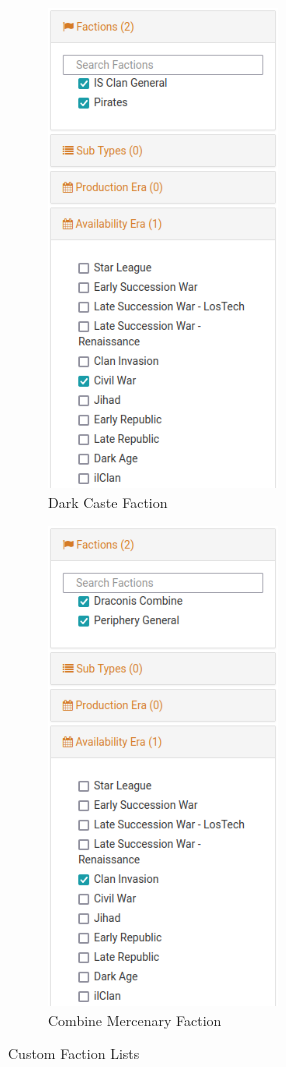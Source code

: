 \begin{figure}[!h]
  \centering
  \begin{subfigure}{0.4\textwidth}
    \centering
    \includegraphics[height=5.0in,width=2.4in]{img/Dark-Caste-List.png}
    \caption*{Dark Caste Faction}
  \end{subfigure}
  \hspace{1in}
  \begin{subfigure}{0.4\textwidth}
    \centering
    \includegraphics[height=5.0in,width=2.4in]{img/Combine-Mercenary-List.png}
    \caption*{Combine Mercenary Faction}
  \end{subfigure}
  \caption*{Custom Faction Lists}
\end{figure}

